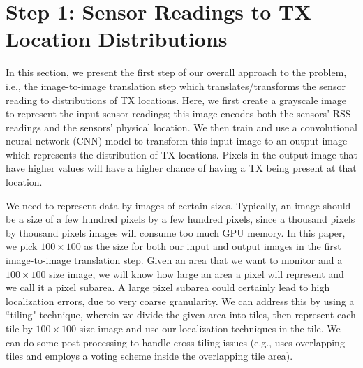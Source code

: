 \section{\bf \our Step 1: Sensor Readings to TX Location Distributions}
\label{sec:translate}

In this section, we present the first step of our overall approach to the \mtl problem, i.e., 
the image-to-image translation step which translates/transforms the sensor reading to distributions
of TX locations. Here, we first create a grayscale image to represent the input sensor readings;
this image encodes both the sensors' RSS readings and the sensors' physical location. We then train and use
a convolutional neural network (CNN) model to transform this input image
to an output image which represents the distribution of TX locations. Pixels in the output image that have higher values will have a higher chance of having a TX being present at that location. 
 
We need to represent data by images of certain sizes.
Typically, an image should be a size of a few hundred pixels by a few hundred pixels, since a thousand pixels by thousand pixels images will consume too much GPU memory.
In this paper, we pick $100\times 100$ as the size for both our input and output images in the first image-to-image translation step.
Given an area that we want to monitor and a $100\times100$ size image, we will know how large an area a pixel will represent and we call it a pixel subarea.
A large pixel subarea could certainly lead to high localization errors, due
to very coarse granularity. We can address this by using a ``tiling"
technique, wherein we divide the given area into tiles, then represent each 
tile by $100\times100$ size image and use our localization techniques in the tile.
We can do some post-processing to handle cross-tiling issues (e.g., \cite{icccn20-deeptxfinder} uses overlapping tiles and employs a voting scheme inside the overlapping tile area).
 
